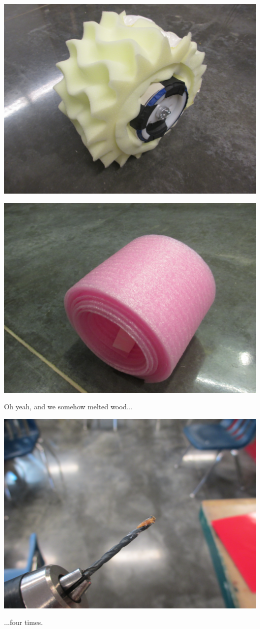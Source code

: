 \begin{center}
 \includegraphics[width=\textwidth]{./Entries/Images/launchProto2.JPG}
\end{center}

\begin{center}
 \includegraphics[width=\textwidth]{./Entries/Images/launchProto12.JPG}
\end{center}

\pagebreak

Oh yeah, and we somehow melted wood...

\begin{center}
 \includegraphics[width=\textwidth]{./Entries/Images/meltedWood.JPG}
\end{center}

...four times.